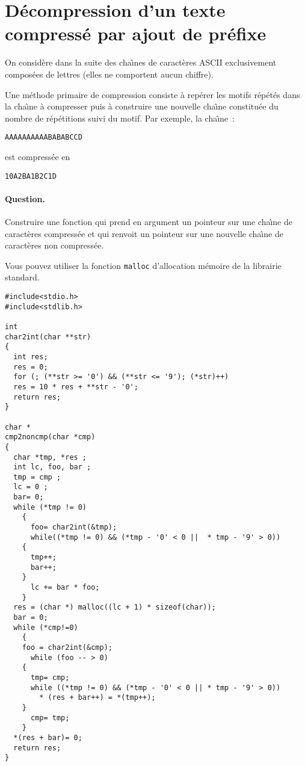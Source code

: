 \section{D\'ecompression d'un texte compress\'e par ajout de pr\'efixe}
On  consid\`ere dans la  suite des cha\^\i{}nes  de caract\`eres ASCII
exclusivement  compos\'ees  de lettres    (elles ne  comportent  aucun
chiffre).
\par
Une m\'ethode  primaire  de  compression  consiste \`a  rep\'erer  les
motifs r\'ep\'et\'es  dans  la  cha\^\i{}ne  \`a  compresser  puis \`a
construire  une  nouvelle   cha\^\i{}ne   constitu\'ee  du  nombre  de
r\'ep\'etitions suivi du motif. Par exemple, la cha\^\i{}ne~:
\begin{verbatim}
AAAAAAAAAABABABCCD
\end{verbatim}
est compress\'ee en
\begin{verbatim}
10A2BA1B2C1D
\end{verbatim}
\paragraph{Question.}
Construire une fonction qui prend    en argument un pointeur sur   une
cha\^\i{}ne de  caract\`eres  compress\'ee et qui renvoit  un pointeur
sur une nouvelle cha\^\i{}ne de caract\`eres non compress\'ee.
\par\smallskip
Vous pouvez utiliser la fonction \verb+malloc+ d'allocation m\'emoire de la librairie standard.
\ifcorrection
\begin{correction}
\newpage
\begin{verbatim}
#include<stdio.h>
#include<stdlib.h>

int 
char2int(char **str)
{
  int res;
  res = 0;
  for (; (**str >= '0') && (**str <= '9'); (*str)++)
  res = 10 * res + **str - '0';
  return res;
}

char *
cmp2noncmp(char *cmp)
{
  char *tmp, *res ;
  int lc, foo, bar ;
  tmp = cmp ;
  lc = 0 ;
  bar= 0;
  while (*tmp != 0)
    {
      foo= char2int(&tmp);
      while((*tmp != 0) && (*tmp - '0' < 0 ||  * tmp - '9' > 0)) 
	{
	  tmp++;
	  bar++;
	}
      lc += bar * foo;
    }
  res = (char *) malloc((lc + 1) * sizeof(char));
  bar = 0;
  while (*cmp!=0) 
    {
    foo = char2int(&cmp);
      while (foo -- > 0) 
	{
	  tmp= cmp;
	  while ((*tmp != 0) && (*tmp - '0' < 0 || * tmp - '9' > 0))
	    * (res + bar++) = *(tmp++);
	}
      cmp= tmp;
    }
  *(res + bar)= 0;
  return res;
}
\end{verbatim}
\end{correction}
\fi